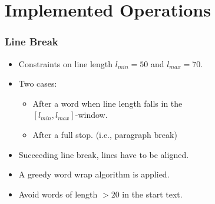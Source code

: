 \documentclass{beamer}
\begin{document}
\section{Implemented Operations}

\begin{frame}
\frametitle{Line Break}


\begin{itemize}
\item Constraints on line length $l_{min}=50$ and $l_{max}=70.$



\item Two cases: 



\begin{itemize}
\item After a word when line length falls in the\\
 $[l_{min},l_{max}]$-window.
\item After a full stop. (i.e., paragraph break)
\end{itemize}


\item Succeeding line break, lines have to be aligned.

\item A greedy word wrap algorithm is applied. 

\item Avoid words of length $>20$ in the start text.
\end{itemize}




\end{frame}
\end{document}

